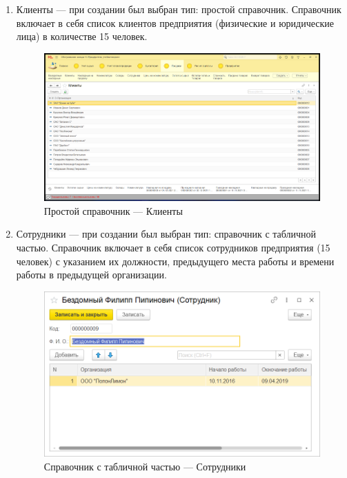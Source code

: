 \documentclass[12pt,a4paper]{article}
\begin{document}
\begin{enumerate}
    \item Клиенты --- при создании был выбран тип: простой справочник. Справочник включает в себя список клиентов предприятия (физические и юридические лица) в количестве 15 человек.
    
    \begin{figure}[!ht]
        \centering
        \includegraphics[scale=0.4]{Простой справочник.png}
        \caption{Простой справочник --- Клиенты}
        \label{fig:client}
    \end{figure}
    
    \item Сотрудники --- при создании был выбран тип: справочник с табличной частью. Справочник включает в себя список сотрудников предприятия (15 человек) с указанием их должности, предыдущего места работы и времени работы в предыдущей организации.
    
    \begin{figure}[!ht]
        \centering
        \includegraphics[scale=0.9]{Справочник с табличной частью.png}
        \caption{Справочник с табличной частью --- Сотрудники}
        \label{fig:worker}
    \end{figure}
    

\end{enumerate}
\end{document}
